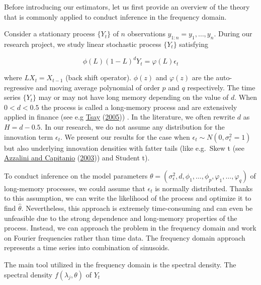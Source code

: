 \documentclass[
  11pt,
]{article}
\begin{document}
Before introducing our estimators, let us first provide an overview of
the theory that is commonly applied to conduct inference in the
frequency domain.

Consider a stationary process \(\{Y_t\}\) of \(n\) observations
\(y_{1:n} = y_1, … ,y_n\). During our research project, we study linear
stochastic process \(\{Y_t\}\) satisfying

\[
\phi(L)(1-L)^{d} Y_{t}=\varphi(L) \epsilon_{t}
\]

where \(LX_t = X_{t-1}\) (back shift operator). \(\phi(z)\) and
\(\varphi(z)\) are the auto-regressive and moving average polynomial of
order \(p\) and \(q\) respectively. The time series \(\{Y_t\}\) may or
may not have long memory depending on the value of \(d\). When
\(0 < d < 0.5\) the process is called a long-memory process and are
extensively applied in finance (see e.g
\protect\hyperlink{ref-tsay2005analysis}{Tsay}
(\protect\hyperlink{ref-tsay2005analysis}{2005})) . In the literature,
we often rewrite \(d\) as \(H = d - 0.5\). In our research, we do not
assume any distribution for the innovation term \(\epsilon_t\). We
present our results for the case when
\(\epsilon_t \sim N(0,\sigma^2_\epsilon =1)\) but also underlying
innovation densities with fatter tails (like e.g.~Skew t (see
\protect\hyperlink{ref-azzalini2003distributions}{Azzalini and
Capitanio} (\protect\hyperlink{ref-azzalini2003distributions}{2003}))
and Student t).

To conduct inference on the model parameters
\(\theta=\left(\sigma_{\epsilon}^{2}, d, \phi_{1}, \ldots, \phi_{p}, \varphi_{1}, \ldots, \varphi_{q}\right)\)
of long-memory processes, we could assume that \(\epsilon_t\) is
normally distributed. Thanks to this assumption, we can write the
likelihood of the process and optimize it to find \(\hat \theta\).
Nevertheless, this approach is extremely time-consuming and can even be
unfeasible due to the strong dependence and long-memory properties of
the process. Instead, we can approach the problem in the frequency
domain and work on Fourier frequencies rather than time data. The
frequency domain approach represents a time series into combination of
sinusoids.

The main tool utilized in the frequency domain is the spectral density.
The spectral density \(f(\lambda_j, \theta)\) of \(Y_t\)
\end{document}
